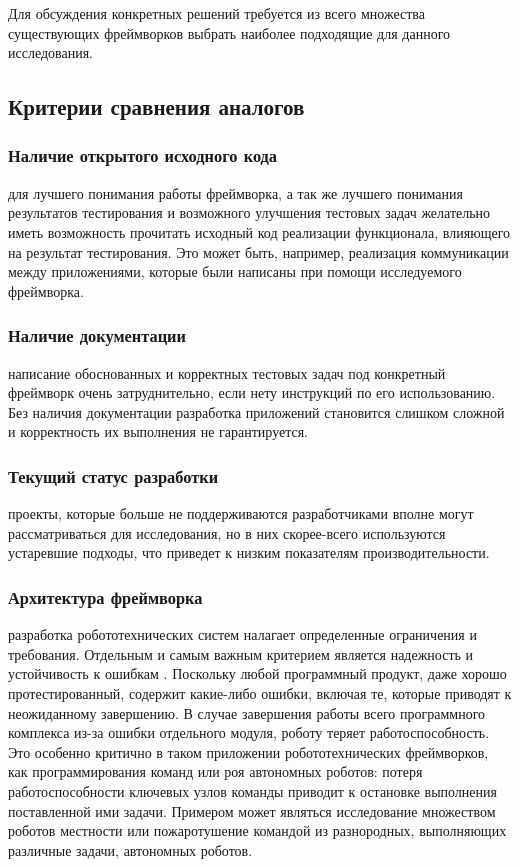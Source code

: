 Для обсуждения конкретных решений требуется из всего множества существующих фреймворков выбрать наиболее подходящие для данного исследования.

\subsection{Критерии сравнения аналогов} 

\subsubsection{Наличие открытого исходного кода} для лучшего понимания работы фреймворка, а так же лучшего понимания результатов тестирования и возможного улучшения тестовых задач желательно иметь возможность прочитать исходный код реализации функционала, влияющего на результат тестирования. Это может быть, например, реализация коммуникации между приложениями, которые были написаны при помощи исследуемого фреймворка.

\subsubsection{Наличие документации} написание обоснованных и корректных тестовых задач под конкретный фреймворк очень затруднительно, если нету инструкций по его использованию. Без наличия документации разработка приложений становится слишком сложной и корректность их выполнения не гарантируется.

\subsubsection{Текущий статус разработки} проекты, которые больше не поддерживаются разработчиками вполне могут рассматриваться для исследования, но в них скорее-всего используются устаревшие подходы, что приведет к низким показателям производительности.

\subsubsection{Архитектура фреймворка} разработка робототехнических систем налагает определенные ограничения и требования. Отдельным и самым важным критерием является надежность и устойчивость к ошибкам \cite{c1}.  Поскольку любой программный продукт, даже хорошо протестированный, содержит какие-либо ошибки, включая те, которые приводят к неожиданному завершению. В случае завершения работы всего программного комплекса из-за ошибки отдельного модуля, роботу теряет работоспособность. Это особенно критично в таком приложении робототехнических фреймворков, как программирования команд или роя автономных роботов: потеря работоспособности ключевых узлов команды приводит к остановке выполнения поставленной ими задачи. Примером может являться исследование множеством роботов местности или пожаротушение командой из разнородных, выполняющих различные задачи, автономных роботов.

